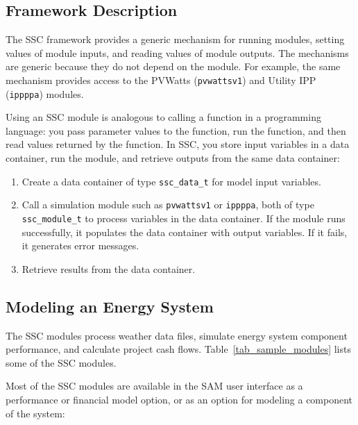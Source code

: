 \documentclass{article}
\begin{document}
\subsection{Framework Description}

The SSC framework provides a generic mechanism for running modules, setting values of module inputs, and reading values of module outputs. The mechanisms are generic because they do not depend on the module. For example, the same mechanism provides access to the PVWatts (\texttt{pvwattsv1}) and Utility IPP (\texttt{ippppa}) modules.  

Using an SSC module is analogous to calling a function in a programming language: you pass parameter values to the function, run the function, and then read values returned by the function.  In SSC, you store input variables in a data container, run the module, and retrieve outputs from the same data container:

\begin{enumerate}
\item Create a data container of type \texttt{ssc\_data\_t} for model input variables.
\item Call a simulation module such as \texttt{pvwattsv1} or \texttt{ippppa}, both of type \texttt{ssc\_module\_t} to process variables in the data container. If the module runs successfully, it populates the data container with output variables. If it fails, it generates error messages.
\item Retrieve results from the data container.
\end{enumerate}

\subsection{Modeling an Energy System}
\label{sec_modeling_systems}
The SSC modules process weather data files, simulate energy system component performance, and calculate project cash flows. Table~\ref{tab_sample_modules} lists some of the SSC modules.

Most of the SSC modules are available in the SAM user interface as a performance or financial model option, or as an option for modeling a component of the system:
\end{document}

